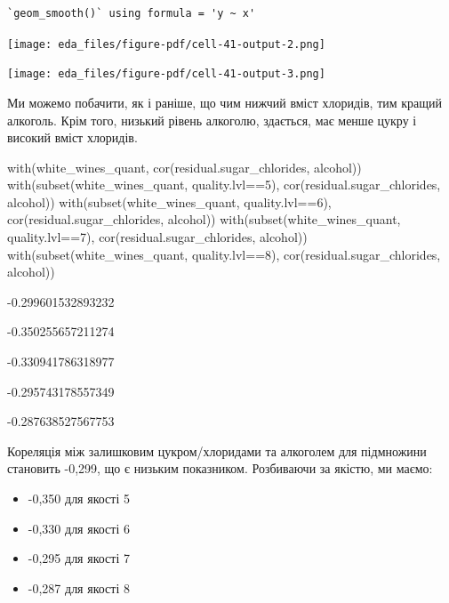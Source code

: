 \documentclass[
  letterpaper,
  DIV=11,
  numbers=noendperiod]{scrreprt}
\newenvironment{Shaded}{\begin{snugshade}}{\end{snugshade}}
\newcommand{\DecValTok}[1]{\textcolor[rgb]{0.68,0.00,0.00}{#1}}
\newcommand{\FunctionTok}[1]{\textcolor[rgb]{0.28,0.35,0.67}{#1}}
\newcommand{\NormalTok}[1]{\textcolor[rgb]{0.00,0.23,0.31}{#1}}
\newcommand{\SpecialCharTok}[1]{\textcolor[rgb]{0.37,0.37,0.37}{#1}}
\providecommand{\tightlist}{%
  \setlength{\itemsep}{0pt}\setlength{\parskip}{0pt}}\usepackage{longtable,booktabs,array}
\begin{document}
\begin{verbatim}
`geom_smooth()` using formula = 'y ~ x'
\end{verbatim}

\texttt{[image: eda\_files/figure-pdf/cell-41-output-2.png]}

\texttt{[image: eda\_files/figure-pdf/cell-41-output-3.png]}

Ми можемо побачити, як і раніше, що чим нижчий вміст хлоридів, тим
кращий алкоголь. Крім того, низький рівень алкоголю, здається, має менше
цукру і високий вміст хлоридів.

\begin{Shaded}
\begin{Highlighting}[]
\FunctionTok{with}\NormalTok{(white\_wines\_quant, }\FunctionTok{cor}\NormalTok{(residual.sugar\_chlorides, alcohol))}
\FunctionTok{with}\NormalTok{(}\FunctionTok{subset}\NormalTok{(white\_wines\_quant, quality.lvl}\SpecialCharTok{==}\DecValTok{5}\NormalTok{),}
     \FunctionTok{cor}\NormalTok{(residual.sugar\_chlorides, alcohol))}
\FunctionTok{with}\NormalTok{(}\FunctionTok{subset}\NormalTok{(white\_wines\_quant, quality.lvl}\SpecialCharTok{==}\DecValTok{6}\NormalTok{),}
     \FunctionTok{cor}\NormalTok{(residual.sugar\_chlorides, alcohol))}
\FunctionTok{with}\NormalTok{(}\FunctionTok{subset}\NormalTok{(white\_wines\_quant, quality.lvl}\SpecialCharTok{==}\DecValTok{7}\NormalTok{),}
     \FunctionTok{cor}\NormalTok{(residual.sugar\_chlorides, alcohol))}
\FunctionTok{with}\NormalTok{(}\FunctionTok{subset}\NormalTok{(white\_wines\_quant, quality.lvl}\SpecialCharTok{==}\DecValTok{8}\NormalTok{),}
     \FunctionTok{cor}\NormalTok{(residual.sugar\_chlorides, alcohol))}
\end{Highlighting}
\end{Shaded}

-0.299601532893232

-0.350255657211274

-0.330941786318977

-0.295743178557349

-0.287638527567753

Кореляція між залишковим цукром/хлоридами та алкоголем для підмножини
становить -0,299, що є низьким показником. Розбиваючи за якістю, ми
маємо:

\begin{itemize}
\tightlist
\item
  -0,350 для якості 5
\item
  -0,330 для якості 6
\item
  -0,295 для якості 7
\item
  -0,287 для якості 8
\end{itemize}
\end{document}
